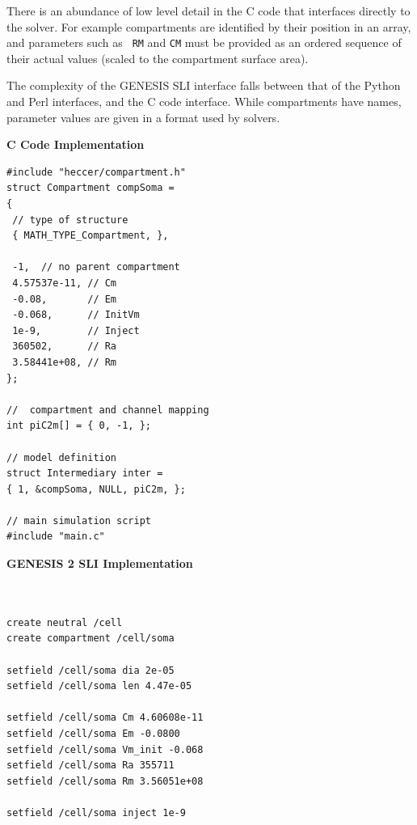 \documentclass[12pt]{article}
\begin{document}
There is an abundance of low level detail in the C code that
interfaces directly to the solver.  For example compartments are
identified by their position in an array, and parameters such as {\tt
  RM} and {\tt CM} must be provided as an ordered sequence of their
actual values (scaled to the compartment surface area).

The complexity of the GENESIS SLI interface falls between that of the
Python and Perl interfaces, and the C code interface.  While compartments have
names, parameter values are given in a format used by solvers.

{\vspace*{3mm} \footnotesize
  \begin{minipage}{1\linewidth}
    
    \begin{minipage}[t]{.50\linewidth}
{\bf C Code Implementation}
\resetlinenumber
\begin{verbatim}
#include "heccer/compartment.h"
struct Compartment compSoma =
{
 // type of structure
 { MATH_TYPE_Compartment, },

 -1,  // no parent compartment
 4.57537e-11, // Cm
 -0.08,       // Em
 -0.068,      // InitVm
 1e-9,        // Inject
 360502,      // Ra
 3.58441e+08, // Rm
};

//  compartment and channel mapping
int piC2m[] = { 0, -1, };

// model definition
struct Intermediary inter =
{ 1, &compSoma, NULL, piC2m, };

// main simulation script
#include "main.c"

\end{verbatim}
    \end{minipage}
    \begin{minipage}[t]{.50\linewidth}
{\bf GENESIS 2 SLI Implementation}
\resetlinenumber
\begin{verbatim}


create neutral /cell
create compartment /cell/soma

setfield /cell/soma dia 2e-05
setfield /cell/soma len 4.47e-05

setfield /cell/soma Cm 4.60608e-11
setfield /cell/soma Em -0.0800
setfield /cell/soma Vm_init -0.068
setfield /cell/soma Ra 355711
setfield /cell/soma Rm 3.56051e+08

setfield /cell/soma inject 1e-9








\end{verbatim}
\end{minipage}
\end{minipage}}
\end{document}

